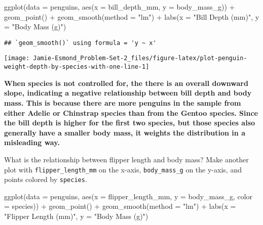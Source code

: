 \documentclass[
]{article}
\newenvironment{Shaded}{\begin{snugshade}}{\end{snugshade}}
\newcommand{\AttributeTok}[1]{\textcolor[rgb]{0.77,0.63,0.00}{#1}}
\newcommand{\FunctionTok}[1]{\textcolor[rgb]{0.00,0.00,0.00}{#1}}
\newcommand{\NormalTok}[1]{#1}
\newcommand{\SpecialCharTok}[1]{\textcolor[rgb]{0.00,0.00,0.00}{#1}}
\newcommand{\StringTok}[1]{\textcolor[rgb]{0.31,0.60,0.02}{#1}}
\begin{document}
\begin{Shaded}
\begin{Highlighting}[]
\FunctionTok{ggplot}\NormalTok{(}\AttributeTok{data =}\NormalTok{ penguins, }
       \FunctionTok{aes}\NormalTok{(}\AttributeTok{x =}\NormalTok{ bill\_depth\_mm, }\AttributeTok{y =}\NormalTok{ body\_mass\_g)) }\SpecialCharTok{+}
  \FunctionTok{geom\_point}\NormalTok{() }\SpecialCharTok{+}
  \FunctionTok{geom\_smooth}\NormalTok{(}\AttributeTok{method =} \StringTok{"lm"}\NormalTok{) }\SpecialCharTok{+}
  \FunctionTok{labs}\NormalTok{(}\AttributeTok{x =} \StringTok{"Bill Depth (mm)"}\NormalTok{, }
       \AttributeTok{y =} \StringTok{"Body Mass (g)"}\NormalTok{)}
\end{Highlighting}
\end{Shaded}

\begin{verbatim}
## `geom_smooth()` using formula = 'y ~ x'
\end{verbatim}

\begin{center}\texttt{[image: Jamie-Esmond\_Problem-Set-2\_files/figure-latex/plot-penguin-weight-depth-by-species-with-one-line-1]} \end{center}

\textbf{When species is not controlled for, the there is an overall
downward slope, indicating a negative relationship between bill depth
and body mass. This is because there are more penguins in the sample
from either Adelie or Chinstrap species than from the Gentoo species.
Since the bill depth is higher for the first two species, but those
species also generally have a smaller body mass, it weights the
distribution in a misleading way. }

What is the relationship between flipper length and body mass? Make
another plot with \texttt{flipper\_length\_mm} on the x-axis,
\texttt{body\_mass\_g} on the y-axis, and points colored by
\texttt{species}.

\begin{Shaded}
\begin{Highlighting}[]
\FunctionTok{ggplot}\NormalTok{(}\AttributeTok{data =}\NormalTok{ penguins, }
       \FunctionTok{aes}\NormalTok{(}\AttributeTok{x =}\NormalTok{ flipper\_length\_mm, }\AttributeTok{y =}\NormalTok{ body\_mass\_g, }\AttributeTok{color =}\NormalTok{ species)) }\SpecialCharTok{+}
  \FunctionTok{geom\_point}\NormalTok{() }\SpecialCharTok{+}
  \FunctionTok{geom\_smooth}\NormalTok{(}\AttributeTok{method =} \StringTok{"lm"}\NormalTok{) }\SpecialCharTok{+}
  \FunctionTok{labs}\NormalTok{(}\AttributeTok{x =} \StringTok{"Flipper Length (mm)"}\NormalTok{, }
       \AttributeTok{y =} \StringTok{"Body Mass (g)"}\NormalTok{)}
\end{Highlighting}
\end{Shaded}
\end{document}
